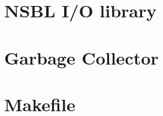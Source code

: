 \documentclass[letterpaper, 10pt]{article}
\begin{document}
\section{NSBL I/O library}






\section{Garbage Collector }



\section{Makefile}


\end{document}
